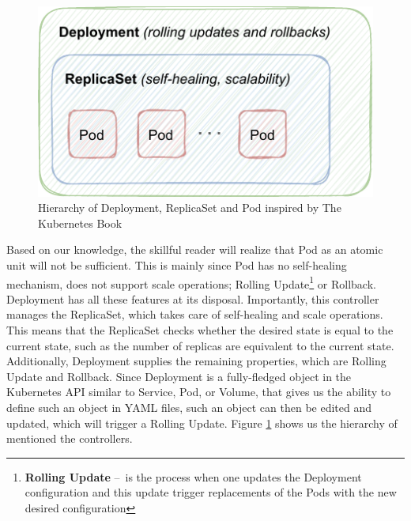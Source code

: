 \begin{enumerate}
    \begin{figure}[!htb]
        \centering
        \includegraphics[scale=1.2]{obrazky-figures/02-preliminaries/01-kubernetes/03-deplyoment-archite}
        \caption{Hierarchy of Deployment, ReplicaSet and Pod inspired by The Kubernetes Book \cite{kubernetesBook}}
        \label{fig:kubernetes:deploymentReplicaSetPod}
    \end{figure}
    Based on our knowledge, the skillful reader will realize that Pod as an atomic unit will not be sufficient.
    This is mainly since Pod has no self-healing mechanism, does not support scale operations;
    Rolling Update\footnote{\textbf{Rolling Update} \---\ is the process when one updates the Deployment configuration and this update trigger replacements of the Pods with the new desired configuration} or Rollback.
    Deployment has all these features at its disposal.
    Importantly, this controller manages the ReplicaSet, which takes care of self-healing and scale operations.
    This means that the ReplicaSet checks whether the desired state is equal to the current state, such as the number of replicas are equivalent to the current state.
    Additionally, Deployment supplies the remaining properties, which are Rolling Update and Rollback.
    Since Deployment is a fully-fledged object in the Kubernetes API similar to Service, Pod, or Volume, that gives us the ability to define such an object in YAML files, such an object can then be edited and updated, which will trigger a Rolling Update.
    Figure \ref{fig:kubernetes:deploymentReplicaSetPod} shows us the hierarchy of mentioned the controllers.


\end{enumerate}
